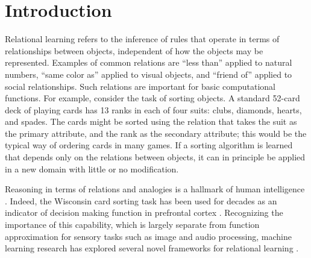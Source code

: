 \section{Introduction}
\label{sec:intro}

Relational learning refers to the inference of rules that operate in terms of
relationships between objects, independent of how the objects may be represented. Examples of common relations are
``less than'' applied to natural numbers, ``same color as'' applied to visual objects, and ``friend of'' applied to
social relationships. Such relations are important for basic computational functions.  For example, consider the task
of sorting objects. A standard 52-card deck of playing cards has 13 ranks in each of four suits: clubs, diamonds,
hearts, and spades. The cards might be sorted using the relation that takes the suit as the primary attribute,
and the rank as the secondary attribute; this would be the typical
way of ordering cards in many games. If a sorting algorithm is learned that depends 
only on the relations between objects, it can in principle be applied in a new domain with little 
or no modification. 

Reasoning in terms of relations and analogies is a hallmark of human intelligence 
\citep{snow,holyoak}.
Indeed, the Wisconsin card sorting task \citep{berg} has been used for decades as an indicator of decision making
function in prefrontal cortex \citep{monchi}.
Recognizing the importance of this capability,
which is largely separate from function approximation for sensory tasks such as image and audio processing, machine
learning research has explored several novel frameworks for relational learning \citep{TEM, NTM,episodicControl,esbn,mondal23learned,
battaglia,barrett:2018,santoro1}.

